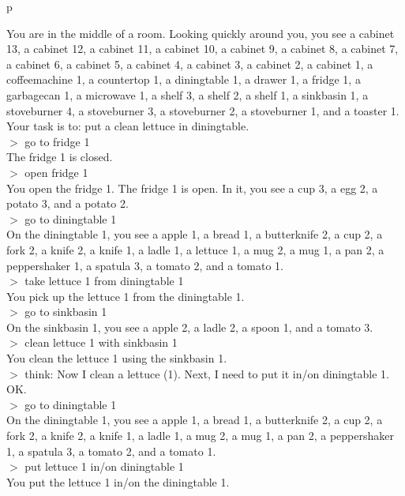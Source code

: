 \begin{table}[H]
\scriptsize
\begin{minipage}{0.9\linewidth}
\caption{An \act{} prompt on the ALFWorld clean task. No thoughts are provided.}
\label{prompt:alfworld_act}
\centering
\ttfamily
\begin{tabular}{p\linewidth}
\toprule

You are in the middle of a room. Looking quickly around you, you see a cabinet 13, a cabinet 12, a cabinet 11, a cabinet 10, a cabinet 9, a cabinet 8, a cabinet 7, a cabinet 6, a cabinet 5, a cabinet 4, a cabinet 3, a cabinet 2, a cabinet 1, a coffeemachine 1, a countertop 1, a diningtable 1, a drawer 1, a fridge 1, a garbagecan 1, a microwave 1, a shelf 3, a shelf 2, a shelf 1, a sinkbasin 1, a stoveburner 4, a stoveburner 3, a stoveburner 2, a stoveburner 1, and a toaster 1.
Your task is to: put a clean lettuce in diningtable.\\
$>$ go to fridge 1\\
The fridge 1 is closed.\\
$>$ open fridge 1\\
You open the fridge 1. The fridge 1 is open. In it, you see a cup 3, a egg 2, a potato 3, and a potato 2.\\
$>$ go to diningtable 1\\
On the diningtable 1, you see a apple 1, a bread 1, a butterknife 2, a cup 2, a fork 2, a knife 2, a knife 1, a ladle 1, a lettuce 1, a mug 2, a mug 1, a pan 2, a peppershaker 1, a spatula 3, a tomato 2, and a tomato 1.\\
$>$ take lettuce 1 from diningtable 1\\
You pick up the lettuce 1 from the diningtable 1.\\
$>$ go to sinkbasin 1\\
On the sinkbasin 1, you see a apple 2, a ladle 2, a spoon 1, and a tomato 3.\\
$>$ clean lettuce 1 with sinkbasin 1\\
You clean the lettuce 1 using the sinkbasin 1.\\
$>$ think: Now I clean a lettuce (1). Next, I need to put it in/on diningtable 1.\\
OK.\\
$>$ go to diningtable 1\\
On the diningtable 1, you see a apple 1, a bread 1, a butterknife 2, a cup 2, a fork 2, a knife 2, a knife 1, a ladle 1, a mug 2, a mug 1, a pan 2, a peppershaker 1, a spatula 3, a tomato 2, and a tomato 1.\\
$>$ put lettuce 1 in/on diningtable 1\\
You put the lettuce 1 in/on the diningtable 1.\\



\bottomrule 

\end{tabular}
\end{minipage}%
\end{table}


